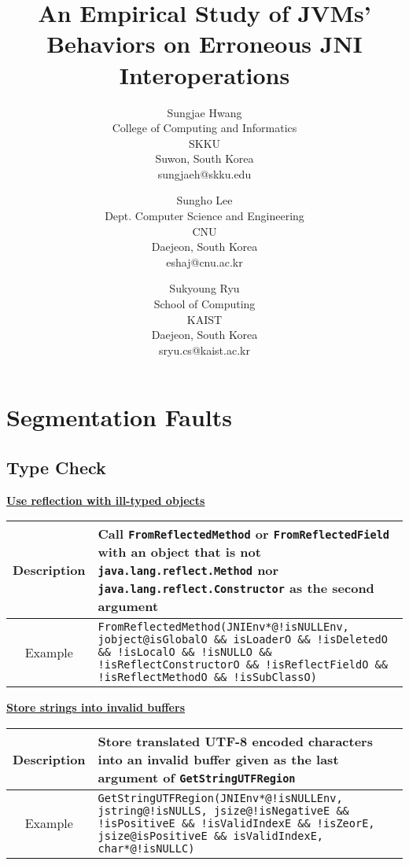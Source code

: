 \documentclass[10pt]{article}
\newcommand{\tc}[1]{\noindent\textbf{\underline{#1}}}
\newcommand{\mytable}[1]{{\renewcommand{\arraystretch}{2.0}
      \begin{tabular}{ c | Y{14cm}} #1
    \end{tabular}}\hfill}
\newcommand{\tctable}[4]{\mytable{#1 & #2 \\\hline #3 & \texttt{#4} \\}}
\begin{document}
\title{\textbf{An Empirical Study of JVMs’ Behaviors on Erroneous JNI Interoperations}}

\author{Sungjae Hwang \\ College of Computing and Informatics \\ SKKU \\ Suwon, South Korea \\ sungjaeh@skku.edu \\
   \and Sungho Lee \\ Dept. Computer Science and Engineering \\ CNU \\ Daejeon, South Korea \\  eshaj@cnu.ac.kr   \\ 
   \and Sukyoung Ryu \\ School of Computing \\ KAIST \\ Daejeon, South Korea \\ sryu.cs@kaist.ac.kr \\}

\maketitle

\section{Segmentation Faults} 
\subsection{Type Check}
\tc{Use reflection with ill-typed objects}

\tctable
{Description}
{Call {\tt FromReflectedMethod} or {\tt FromReflectedField} with an
object that is not {\tt java.lang.reflect.Method} nor {\tt  java.lang.reflect.Constructor}
as the second argument}
{Example}
{FromReflectedMethod(JNIEnv*@!isNULLEnv, jobject@isGlobalO \&\& isLoaderO \&\& !isDeletedO \&\& !isLocalO \&\& !isNULLO \&\& !isReflectConstructorO \&\& !isReflectFieldO \&\& !isReflectMethodO \&\& !isSubClassO)}

\vspace*{3mm}
\tc{Store strings into invalid buffers}

\tctable
{Description}
{Store translated UTF-8 encoded characters into an invalid buffer given as the last argument of {\tt GetStringUTFRegion}}
{Example}
{GetStringUTFRegion(JNIEnv*@!isNULLEnv, jstring@!isNULLS, jsize@!isNegativeE \&\& !isPositiveE \&\& !isValidIndexE \&\& !isZeorE, jsize@isPositiveE \&\& isValidIndexE, char*@!isNULLC)}
\end{document}
